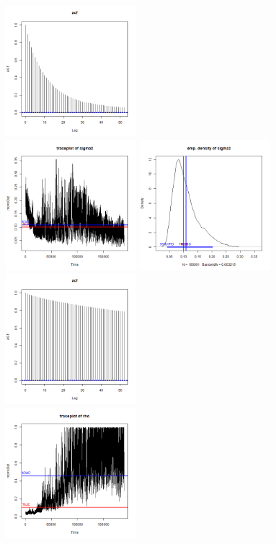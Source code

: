 \documentclass{article}
\begin{document}
\begin{figure}[h]
    \includegraphics[width=5cm]{prob3_beta2_acf.png} \\
    \includegraphics[width=5cm]{prob3_sigma2_traceplot.png} 
    \includegraphics[width=5cm]{prob3_sigma2_density.png} 
    \includegraphics[width=5cm]{prob3_sigma2_acf.png} \\
    \includegraphics[width=5cm]{prob3_rho_traceplot.png} 

\end{figure}
\end{document}
